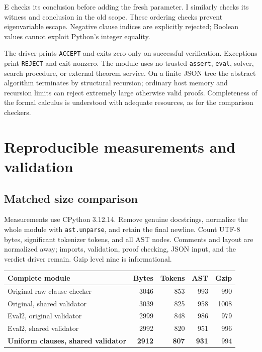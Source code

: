 \documentclass[11pt,letterpaper]{article}
\theoremstyle{definition}\newtheorem{definition}[theorem]{Definition}
\begin{document}
E checks its conclusion before adding the fresh parameter. I similarly
checks its witness and conclusion in the old scope. These ordering checks
prevent eigenvariable escape. Negative clause indices are explicitly
rejected; Boolean values cannot exploit Python's integer equality.

The driver prints \texttt{ACCEPT} and exits zero only on successful
verification. Exceptions print \texttt{REJECT} and exit nonzero. The module
uses no trusted \texttt{assert}, \texttt{eval}, solver, search procedure, or
external theorem service. On a finite JSON tree the abstract algorithm
terminates by structural recursion; ordinary host memory and recursion
limits can reject extremely large otherwise valid proofs. Completeness of
the formal calculus is understood with adequate resources, as for the
comparison checkers.

\section{Reproducible measurements and validation}

\subsection{Matched size comparison}

Measurements use CPython 3.12.14. Remove genuine docstrings, normalize the
whole module with \texttt{ast.unparse}, and retain the final newline. Count
UTF-8 bytes, significant tokenizer tokens, and all AST nodes. Comments and
layout are normalized away; imports, validation, proof checking, JSON input,
and the verdict driver remain. Gzip level nine is informational.

\begin{center}\small
\begin{tabular}{lrrrr}
\toprule
Complete module & Bytes & Tokens & AST & Gzip\\
\midrule
Original raw clause checker & 3046 & 853 & 993 & 990\\
Original, shared validator & 3039 & 825 & 958 & 1008\\
Eval2, original validator & 2999 & 848 & 986 & 979\\
Eval2, shared validator & 2992 & 820 & 951 & 996\\
\textbf{Uniform clauses, shared validator} & \textbf{2912} & \textbf{807} & \textbf{931} & 994\\
\bottomrule
\end{tabular}
\end{center}
\end{document}
